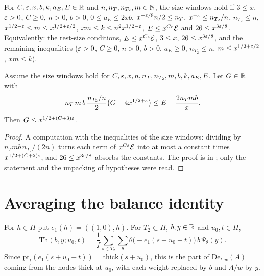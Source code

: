 \begin{definition}\label{bal:size-windows}
For $C,\varepsilon,x,b,k,a_E,E\in\mathbb{R}$ and $n,n_T,n_{T_2},m\in\mathbb{N}$, the size windows hold if $3\le x$, $\varepsilon>0$, $C\ge0$, $n>0$, $b>0$, $0\le a_E\le2xb$, $x^{-\varepsilon/8}n/2\le n_T$, $x^{-\varepsilon}\le n_{T_2}/n$, $n_{T_2}\le n$, $x^{1/2-\varepsilon}\le m\le x^{1/2+\varepsilon/2}$, $xm\le k\le n^2x^{1/2-\varepsilon}$, $E\le x^{C\varepsilon}\mathcal E$ and $26\le x^{3\varepsilon/8}$. Equivalently: the rest-size conditions, $E\le x^{C\varepsilon}\mathcal E$, $3\le x$, $26\le x^{3\varepsilon/8}$, and the remaining inequalities ($\varepsilon>0$, $C\ge0$, $n>0$, $b>0$, $a_E\ge0$, $n_{T_2}\le n$, $m\le x^{1/2+\varepsilon/2}$, $xm\le k$).
\end{definition}

\begin{lemma}\label{bal:size-bound}
Assume the size windows hold for $C,\varepsilon,x,n,n_T,n_{T_2},m,b,k,a_E,E$. Let $G\in\mathbb{R}$ with
\[n_T\,m\,b\,\frac{n_{T_2}/n}{2}\bigl(G-4x^{1/2+\varepsilon}\bigr)\le E+\frac{2n_Tmb}x.\]
Then $G\le x^{1/2+(C+3)\varepsilon}$.
\end{lemma}
\begin{proof}
A computation with the inequalities of the size windows: dividing by $n_Tmb\,n_{T_2}/(2n)$ turns each term of $x^{C\varepsilon}\mathcal E$ into at most a constant times $x^{1/2+(C+2)\varepsilon}$, and $26\le x^{3\varepsilon/8}$ absorbs the constants. The proof is in ; only the statement and the unpacking of hypotheses were read.
\end{proof}

\section{Averaging the balance identity}

\begin{definition}\label{bal:thick-part}
For $h\in H$ put $e_1(h)=((1,0),h)$. For $T_2\subset H$, $b,y\in\mathbb{R}$ and $u_0,t\in H$,
\[\mathrm{Th}(b,y;u_0,t)=\frac1f\sum_{s\in T_2}\sum_{\theta}\theta\bigl(-e_1(s+u_0-t)\bigr)\,b\,\Psi_{\theta}(y).\]
Since $\mathrm{pt}_t(e_1(s+u_0-t))=\mathrm{thick}(s+u_0)$, this is the part of $\mathrm{De}_{t,w}(A)$ coming from the nodes thick at $u_0$, with each weight replaced by $b$ and $A/w$ by $y$.
\end{definition}

